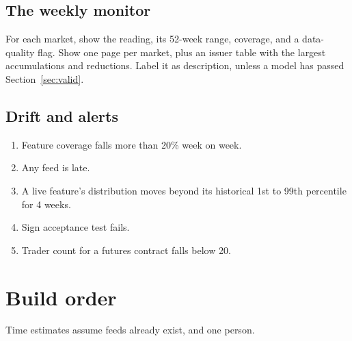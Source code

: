 \documentclass[11pt]{article}
\begin{document}
\subsection{The weekly monitor}
For each market, show the reading, its 52-week range, coverage, and a data-quality flag. Show one page per market, plus an issuer table with the largest accumulations and reductions. Label it as description, unless a model has passed Section~\ref{sec:valid}.

\subsection{Drift and alerts}
\begin{enumerate}
\item Feature coverage falls more than 20\% week on week.
\item Any feed is late.
\item A live feature's distribution moves beyond its historical 1st to 99th percentile for 4 weeks.
\item Sign acceptance test fails.
\item Trader count for a futures contract falls below 20.
\end{enumerate}

\section{Build order}\label{sec:order}
Time estimates assume feeds already exist, and one person.
\end{document}
